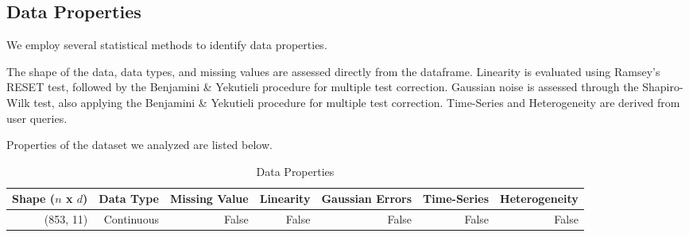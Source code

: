 \documentclass{article}
\begin{document}
\begin{table}[H]
    \centering
    \caption{Dataset Preview}
    
                
\end{table}

\subsection{Data Properties}
We employ several statistical methods to identify data properties.

The shape of the data, data types, and missing values are assessed directly from the dataframe.
Linearity is evaluated using Ramsey’s RESET test, followed by the Benjamini \& Yekutieli procedure for multiple test correction.
Gaussian noise is assessed through the Shapiro-Wilk test, also applying the Benjamini \& Yekutieli procedure for multiple test correction.
Time-Series and Heterogeneity are derived from user queries.

Properties of the dataset we analyzed are listed below.

\begin{table}[H]
    \centering
    \caption{Data Properties}

        \begin{tabular}{rrrrrrr}
        \toprule
        Shape ($n$ x $d$) & Data Type & Missing Value & Linearity & Gaussian Errors & Time-Series & Heterogeneity \\
        \midrule
        (853, 11)   & Continuous & False & False & False & False & False \\
        \bottomrule
        \end{tabular}
        
\end{table}
\end{document}
